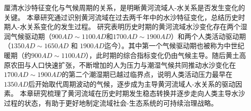 厘清水沙特征变化与气候周期的关系，是明晰黄河流域人-水关系是否发生变化的关键。
本章研究通过识别黄河流域在过去两千年中的水沙特征变化，总结历史时期人-水关系变化的发生过程。
研究表明历史时期的黄河流域水沙变化存在两个湿润气候驱动期（$900AD\sim1100AD$和$1700AD\sim1900AD$）和两个人类活动驱动期（$1350AD \sim 1650AD$ 和 $1900AD$迄今）。其中第一个气候驱动期也被称为中世纪暖期（约$900AD \sim 1100AD$），此时期的综合指标变化仍由气候主导。随后黄土高原农田与人口快速扩张，不断增加的人为压力与潮湿气候共同推动水沙变化在$1700AD \sim 1900AD$的第二个潮湿期已越过临界点，说明人类活动压力最早在$1350AD$后开始取代周期波动的气候，逐步成为主导黄河流域人-水关系的驱动因素。
本章研究梳理了黄河流域在历史时期发生稳态转换并逐步走向人类主导水沙过程的状态，有助于更好地制定流域社会-生态系统的可持续治理战略。
